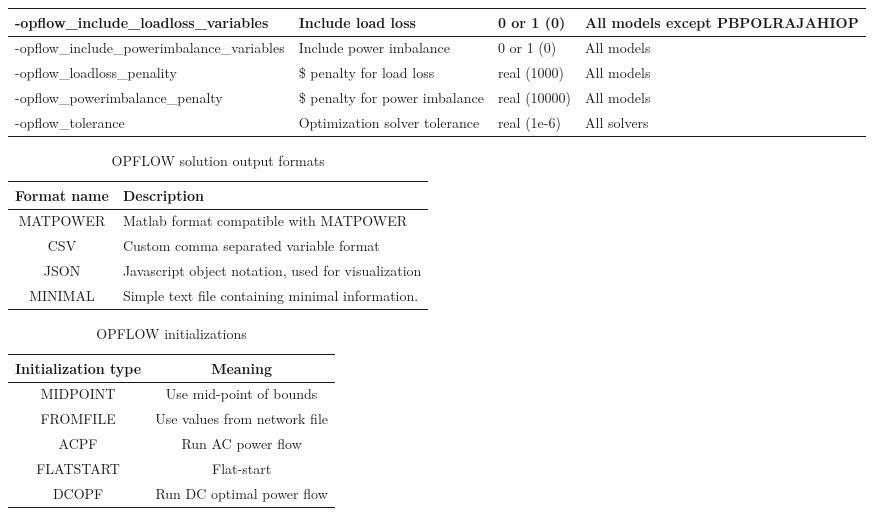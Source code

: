 \begin{table}[H]
\begin{tabular}{|p{}|p{}|p{}|p{}|}
    -opflow\_include\_loadloss\_variables & Include load loss & 0 or 1 (0) & All models except PBPOLRAJAHIOP \\ \hline
    -opflow\_include\_powerimbalance\_variables & Include power imbalance & 0 or 1 (0) & All models \\ \hline
    -opflow\_loadloss\_penality & \$ penalty for load loss & real (1000) & All models \\ \hline
    -opflow\_powerimbalance\_penalty & \$ penalty for power imbalance & real (10000) & All models \\ \hline
    -opflow\_tolerance & Optimization solver tolerance & real (1e-6) & All solvers \\ \hline 
  \end{tabular}
  \label{tab:opflow_options}
\end{table}

\begin{table}[ht!]
  \centering
  \caption{OPFLOW solution output formats}
  \label{tab:opflow_output_format}
  \begin{tabular}{|c|l|}
    \hline
    \textbf{Format name} & \textbf{Description} \\ \hline
    MATPOWER & Matlab format compatible with MATPOWER \\ \hline
    CSV & Custom comma separated variable format \\ \hline
    JSON & Javascript object notation, used for visualization \\ \hline
    MINIMAL & Simple text file containing minimal information. \\ \hline
  \end{tabular}
\end{table}

\begin{table}[!htbp]
  \centering
  \caption{OPFLOW initializations}
  \begin{tabular}{|c|c|}
    \hline
    \textbf{Initialization type} & \textbf{Meaning} \\ \hline
    MIDPOINT & Use mid-point of bounds \\ \hline
    FROMFILE & Use values from network file \\ \hline
    ACPF & Run AC power flow \\ \hline
    FLATSTART & Flat-start \\ \hline
    DCOPF & Run DC optimal power flow \\ \hline
  \end{tabular}
\label{tab:opflow_initializations}
\end{table}

